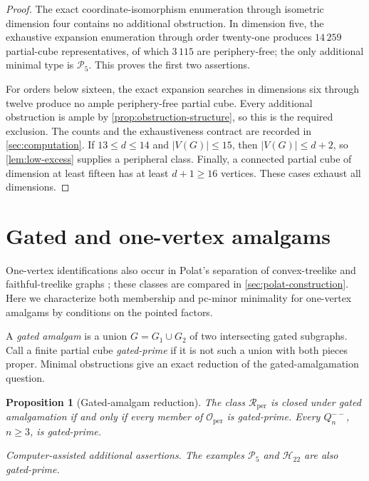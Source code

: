 \documentclass[11pt]{article}
\newtheorem{proposition}[theorem]{Proposition}
\theoremstyle{definition}
\theoremstyle{remark}
\newcommand{\Rper}{\mathcal R_{\mathrm{per}}}
\newcommand{\Oper}{\mathcal O_{\mathrm{per}}}
\begin{document}
\begin{proof}
The exact coordinate-isomorphism enumeration through isometric dimension four
contains no additional obstruction.  In dimension five, the exhaustive
expansion enumeration through order twenty-one produces \(14\,259\) partial-cube
representatives, of which \(3\,115\) are periphery-free; the only additional
minimal type is \(\mathcal P_5\).  This proves the first two assertions.

For orders below sixteen, the exact expansion searches in dimensions six
through twelve produce no ample periphery-free partial cube. Every additional
obstruction is ample by \cref{prop:obstruction-structure}, so this is the
required exclusion.  The counts and the
exhaustiveness contract are recorded in \cref{sec:computation}.  If
\(13\le d\le14\) and \(|V(G)|\le15\), then
\(|V(G)|\le d+2\), so \cref{lem:low-excess} supplies a peripheral class.
Finally, a connected partial cube of dimension at least fifteen has at least
\(d+1\ge16\) vertices.  These cases exhaust all dimensions.
\end{proof}

\section{Gated and one-vertex amalgams}
\label{sec:wedges}

One-vertex identifications also occur in Polat's separation of convex-treelike
and faithful-treelike graphs \cite[pp.~69--70]{Polat12treelike}; these
classes are compared in \cref{sec:polat-construction}. Here we
characterize both membership and pc-minor minimality for one-vertex amalgams
by conditions on the pointed factors.

A \emph{gated amalgam} is a union \(G=G_1\cup G_2\) of two intersecting
gated subgraphs.  Call a finite partial cube \emph{gated-prime} if it is not
such a union with both pieces proper.  Minimal obstructions give an exact
reduction of the gated-amalgamation question.

\begin{proposition}[Gated-amalgam reduction]
\label{prop:gated-reduction}
The class \(\Rper\) is closed under gated amalgamation if and only if every
member of \(\Oper\) is gated-prime. Every \(Q_n^{--}\), \(n\ge3\), is
gated-prime.

\emph{Computer-assisted additional assertions.} The examples
\(\mathcal P_5\) and \(\mathcal H_{22}\) are also gated-prime.
\end{proposition}
\end{document}
